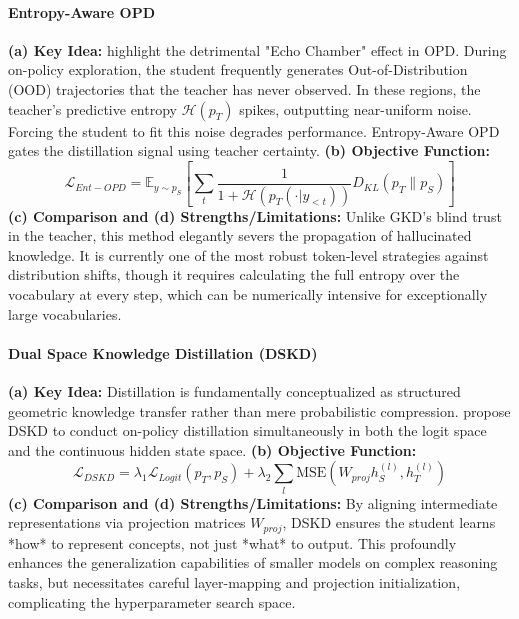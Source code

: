 \paragraph{Entropy-Aware OPD}
\textbf{(a) Key Idea:} \citet{2603.07079} highlight the detrimental "Echo Chamber" effect in OPD. During on-policy exploration, the student frequently generates Out-of-Distribution (OOD) trajectories that the teacher has never observed. In these regions, the teacher's predictive entropy $\mathcal{H}(p_T)$ spikes, outputting near-uniform noise. Forcing the student to fit this noise degrades performance. Entropy-Aware OPD gates the distillation signal using teacher certainty.
\textbf{(b) Objective Function:}
\begin{equation}
    \mathcal{L}_{Ent-OPD} = \mathbb{E}_{y \sim p_S} \left[ \sum_t \frac{1}{1 + \mathcal{H}(p_T(\cdot|y_{<t}))} D_{KL}(p_T \parallel p_S) \right]
\end{equation}
\textbf{(c) Comparison and (d) Strengths/Limitations:} Unlike GKD's blind trust in the teacher, this method elegantly severs the propagation of hallucinated knowledge. It is currently one of the most robust token-level strategies against distribution shifts, though it requires calculating the full entropy over the vocabulary at every step, which can be numerically intensive for exceptionally large vocabularies.

\paragraph{Dual Space Knowledge Distillation (DSKD)}
\textbf{(a) Key Idea:} Distillation is fundamentally conceptualized as structured geometric knowledge transfer rather than mere probabilistic compression. \citet{2502.12018} propose DSKD to conduct on-policy distillation simultaneously in both the logit space and the continuous hidden state space. 
\textbf{(b) Objective Function:}
\begin{equation}
    \mathcal{L}_{DSKD} = \lambda_1 \mathcal{L}_{Logit}(p_T, p_S) + \lambda_2 \sum_{l} \text{MSE}\left( W_{proj} h_S^{(l)}, h_T^{(l)} \right)
\end{equation}
\textbf{(c) Comparison and (d) Strengths/Limitations:} By aligning intermediate representations via projection matrices $W_{proj}$, DSKD ensures the student learns *how* to represent concepts, not just *what* to output. This profoundly enhances the generalization capabilities of smaller models on complex reasoning tasks, but necessitates careful layer-mapping and projection initialization, complicating the hyperparameter search space.

